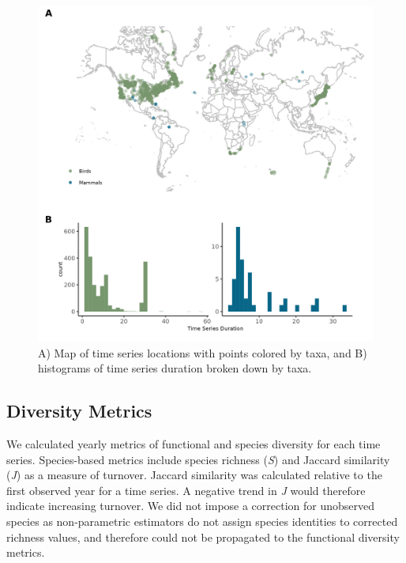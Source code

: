 \documentclass{article}
\begin{document}
\begin{figure}
\includegraphics[width=\textwidth]{../../figures/study_map_hist} \caption{A) Map of time series locations with points colored by taxa, and B) histograms of time series duration broken down by taxa.}\label{fig:taxaMap}
\end{figure}

\hypertarget{diversity-metrics}{%
\subsection{Diversity Metrics}\label{diversity-metrics}}

We calculated yearly metrics of functional and species diversity for
each time series. Species-based metrics include species richness
(\emph{S}) and Jaccard similarity (\emph{J}) as a measure of turnover.
Jaccard similarity was calculated relative to the first observed year
for a time series. A negative trend in \emph{J} would therefore indicate
increasing turnover. We did not impose a correction for unobserved
species as non-parametric estimators do not assign species identities to
corrected richness values, and therefore could not be propagated to the
functional diversity metrics.
\end{document}

